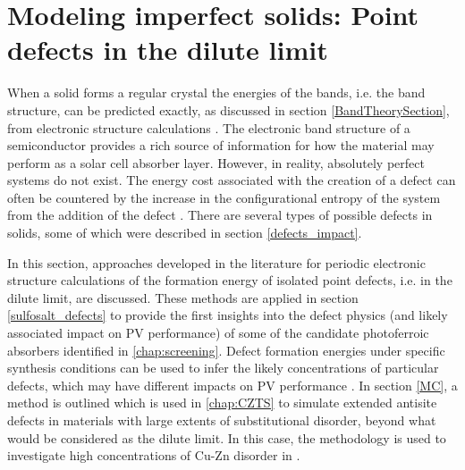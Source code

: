 \documentclass[11pt, twoside]{report}
\begin{document}
\section{Modeling imperfect solids: Point defects in the dilute limit}\label{defects_methods}
When a solid forms a regular crystal the energies of the bands, i.e. the band structure, can be predicted exactly, as discussed in section \ref{BandTheorySection}, from electronic structure calculations \cite{Nelson3}.
The electronic band structure of a semiconductor provides a rich source of information for how the material may perform as a solar cell absorber layer. However, in reality, absolutely perfect systems do not exist. The energy cost associated with the creation of a defect can often be countered by the increase in the configurational entropy of the system from the addition of the defect \cite{AshcroftMermin_general}.
There are several types of possible defects in solids, some of which were described in section \ref{defects_impact}. 

In this section, approaches developed in the literature for periodic electronic structure calculations of the formation energy of isolated point defects, i.e. in the dilute limit, are discussed. 
These methods are applied in section \ref{sulfosalt_defects} to provide the first insights into the defect physics (and likely associated impact on PV performance) of some of the candidate photoferroic absorbers identified in \autoref{chap:screening}. 
Defect formation energies under specific synthesis conditions can be used to infer the likely concentrations of particular defects, which may have different impacts on PV performance \cite{Aron_defect_tolerance}. 
In section \ref{MC}, a method is outlined which is used in \autoref{chap:CZTS} to simulate extended antisite defects in materials with large extents of substitutional disorder, beyond what would be considered as the dilute limit. In this case, the methodology is used to investigate high concentrations of Cu-Zn disorder in {\CZTS}. 
\end{document}
